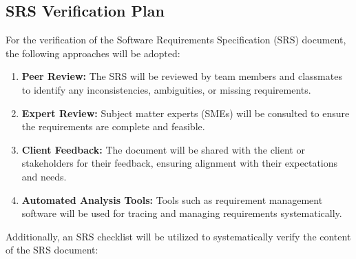 \documentclass[12pt, titlepage]{article}
\begin{document}
\subsection{SRS Verification Plan}

For the verification of the Software Requirements Specification (SRS) document, the following approaches will be adopted:

\begin{enumerate}
    \item \textbf{Peer Review:} The SRS will be reviewed by team members and classmates to identify any inconsistencies, ambiguities, or missing requirements.
    \item \textbf{Expert Review:} Subject matter experts (SMEs) will be consulted to ensure the requirements are complete and feasible.
    \item \textbf{Client Feedback:} The document will be shared with the client or stakeholders for their feedback, ensuring alignment with their expectations and needs.
    \item \textbf{Automated Analysis Tools:} Tools such as requirement management software will be used for tracing and managing requirements systematically.
\end{enumerate}

Additionally, an SRS checklist will be utilized to systematically verify the content of the SRS document:
\end{document}
